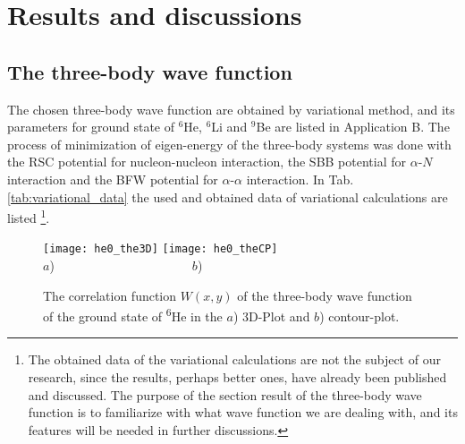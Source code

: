 \documentclass[
12pt, %
oneside, %
english, %
onehalfspacing, %
onehalfspacing, %
headsepline, %
]{MastersDoctoralThesis} %
\newcommand{\he}{\textsuperscript{6}He\xspace}
\begin{document}
\renewcommand\floatpagefraction{0.1}
\chapter{Results and discussions}

\section{The three-body wave function}
The chosen three-body wave function are obtained by variational method, and its parameters for ground state of $^6$He, $^6$Li and $^9$Be are listed in Application B. The process of minimization of eigen-energy of the three-body systems was done with the RSC potential \cite{day1981three} for nucleon-nucleon interaction, the SBB potential \cite{sack1954elastic} for  $\alpha$-$N$ interaction and the BFW potential \cite{buck1977local} for $\alpha$-$\alpha$ interaction.  In Tab. \ref{tab:variational_data} the used and obtained data of variational calculations are listed \footnote{The obtained data of the variational calculations are not the subject of our research, since the results, perhaps better ones, have already been published and discussed. The purpose of  the section result of the three-body wave function   is to familiarize with what wave function we are dealing with, and its features will be needed in further discussions.}.
 
\begin{figure}[bp]
\centering
\texttt{[image: he0\_the3D]}
\texttt{[image: he0\_theCP]} \\
{\footnotesize $a$)}~~~~~~~~~~~~~~~~~~~~~~{\footnotesize $b$)}\\
\decoRule
\caption{ \footnotesize The correlation function $W(x ,y)$ of the three-body wave function of the ground state of \he in the $a$) 3D-Plot  and $b$)  contour-plot.}
\label{fig:he0_the3D}
\end{figure}
 
\end{document}
